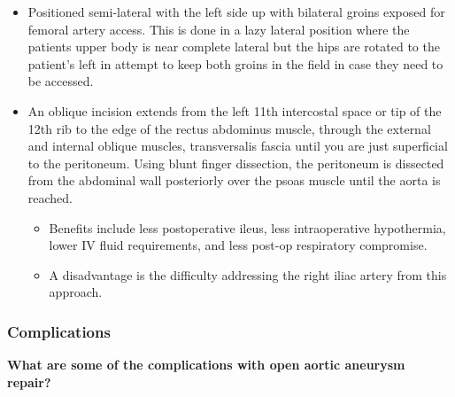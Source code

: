 \documentclass[
]{book}
\begin{document}
\begin{itemize}
  \begin{itemize}
  \item
    Positioned semi-lateral with the left side up with bilateral
    groins exposed for femoral artery access. This is done in a lazy
    lateral position where the patients upper body is near complete
    lateral but the hips are rotated to the patient's left in
    attempt to keep both groins in the field in case they need to be
    accessed.
  \item
    An oblique incision extends from the left 11th intercostal space
    or tip of the 12th rib to the edge of the rectus abdominus
    muscle, through the external and internal oblique muscles,
    transversalis fascia until you are just superficial to the
    peritoneum. Using blunt finger dissection, the peritoneum is
    dissected from the abdominal wall posteriorly over the psoas
    muscle until the aorta is reached.

    \begin{itemize}
    \item
      Benefits include less postoperative ileus, less
      intraoperative hypothermia, lower IV fluid requirements, and
      less post-op respiratory compromise.
    \item
      A disadvantage is the difficulty addressing the right iliac
      artery from this approach.
    \end{itemize}
  \end{itemize}
\end{itemize}

\hypertarget{complications}{%
\subsubsection{Complications}\label{complications}}

\textbf{What are some of the complications with open aortic aneurysm repair?}
\citep{mooreVascularEndovascularSurgery2019}
\end{document}
